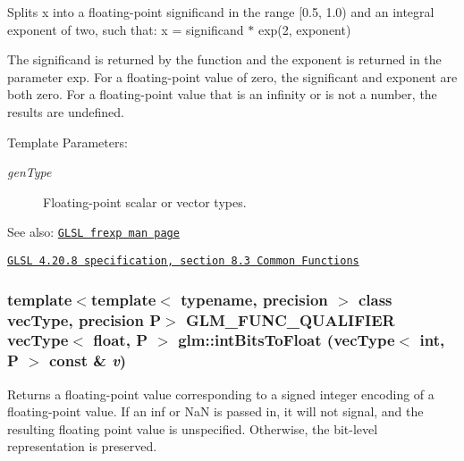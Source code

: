 Splits x into a floating-point significand in the range \mbox{[}0.5, 1.0) and an integral exponent of two, such that: x = significand $\ast$ exp(2, exponent)

The significand is returned by the function and the exponent is returned in the parameter exp. For a floating-point value of zero, the significant and exponent are both zero. For a floating-point value that is an infinity or is not a number, the results are undefined.

\begin{Desc}
\item[Template Parameters:]
\begin{description}
\item[{\em genType}]Floating-point scalar or vector types.\end{description}
\end{Desc}
\begin{Desc}
\item[See also:]\href{http://www.opengl.org/sdk/docs/manglsl/xhtml/frexp.xml}{\tt GLSL frexp man page} 

\href{http://www.opengl.org/registry/doc/GLSLangSpec.4.20.8.pdf}{\tt GLSL 4.20.8 specification, section 8.3 Common Functions} \end{Desc}
\hypertarget{group__core__func__common_gb3619a03062573cb024a4deed71e21dc}{
\subsubsection[intBitsToFloat]{\setlength{\rightskip}{0pt plus 5cm}template$<$template$<$ typename, precision $>$ class vecType, precision P$>$ GLM\_\-FUNC\_\-QUALIFIER vecType$<$ float, P $>$ glm::intBitsToFloat (vecType$<$ int, P $>$ const \& {\em v})}}
\label{group__core__func__common_gb3619a03062573cb024a4deed71e21dc}


Returns a floating-point value corresponding to a signed integer encoding of a floating-point value. If an inf or NaN is passed in, it will not signal, and the resulting floating point value is unspecified. Otherwise, the bit-level representation is preserved.

